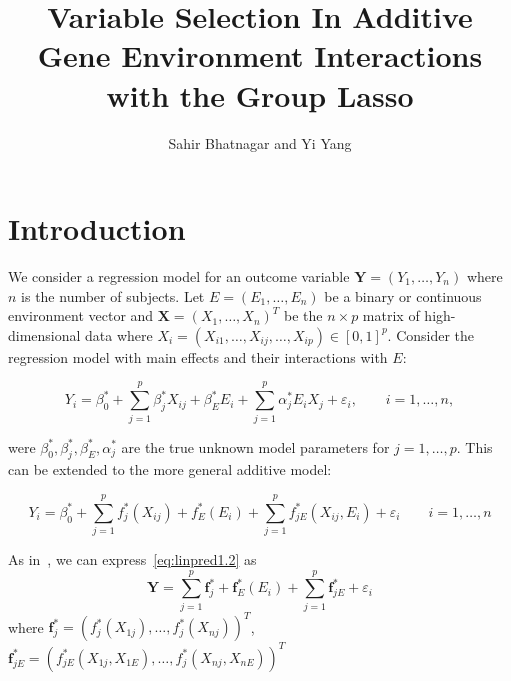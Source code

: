 \documentclass[12pt,letter]{article}
\title{Variable Selection In Additive Gene Environment Interactions with the Group Lasso}
\author{Sahir Bhatnagar and Yi Yang}
\newcommand{\mb}[1]{\mathbf{#1}}
\newcommand{\bx}{\mathbf{X}}
\begin{document}
\newpage
\pagestyle{fancy}

\maketitle
\section{Introduction}



We consider a regression model for an outcome variable $\mathbf{Y}=(Y_1, \ldots, Y_n)$ where $n$ is the number of subjects. Let $E=(E_1, \ldots, E_n)$ be a binary or continuous environment vector and \mbox{$\bx = (X_{1}, \ldots, X_{n})^T$} be the $n \times p$ matrix of high-dimensional data where $X_i = (X_{i1}, \ldots,X_{ij}, \ldots,  X_{ip}) \in [0,1]^p$. Consider the regression model with main effects and their interactions with $E$:

\begin{equation}  
Y_i = \beta^*_0 + \sum_{j=1}^p \beta^*_j X_{ij} + \beta^*_E E_i + \sum_{j=1}^p \alpha^*_j E_i X_j + \varepsilon_i, \qquad i=1, \ldots, n \label{eq:linpred1.1},
\end{equation}

were $\beta^*_0,\beta^*_j,\beta^*_E,\alpha^*_j$ are the true unknown model parameters for $j=1, \ldots, p$. This can be extended to the more general additive model:

\begin{equation}  
Y_i = \beta^*_0 + \sum_{j=1}^p f^*_j (X_{ij}) + f_E^*(E_i) + \sum_{j=1}^p f^*_{jE} (X_{ij},E_i) + \varepsilon_i \qquad i=1, \ldots, n \label{eq:linpred1.2}
\end{equation}

As in~\citep{radchenko2010variable}, we can express~\eqref{eq:linpred1.2} as 
\begin{equation}
\mb{Y} =  \sum_{j=1}^p \mb{f}^*_j + \mb{f}_E^*(E_i) + \sum_{j=1}^p \mb{f}^*_{jE} + \varepsilon_i 
\end{equation}
where $\mb{f}^*_j = \left(f_j^*(X_{1j}), \ldots, f_j^*(X_{nj})\right)^T$, $\mb{f}^*_{jE} = \left(f_{jE}^*(X_{1j},X_{1E}), \ldots, f_j^*(X_{nj}, X_{nE})\right)^T$














\newpage
%


\end{document}
